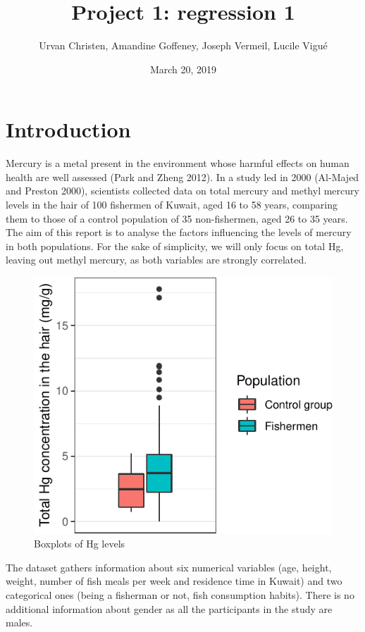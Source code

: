 \documentclass[12pt,]{article}
\title{Project 1: regression 1}
\author{Urvan Christen, Amandine Goffeney, Joseph Vermeil, Lucile Vigué}
\date{March 20, 2019}
\begin{document}
\maketitle

\section{Introduction}\label{introduction}

Mercury is a metal present in the environment whose harmful effects on
human health are well assessed (Park and Zheng 2012). In a study led in
2000 (Al-Majed and Preston 2000), scientists collected data on total
mercury and methyl mercury levels in the hair of 100 fishermen of
Kuwait, aged 16 to 58 years, comparing them to those of a control
population of 35 non-fishermen, aged 26 to 35 years. The aim of this
report is to analyse the factors influencing the levels of mercury in
both populations. For the sake of simplicity, we will only focus on
total Hg, leaving out methyl mercury, as both variables are strongly
correlated.

\begin{figure}

\hfill{}\includegraphics{Report_files/figure-latex/unnamed-chunk-4-1} 

\caption{Boxplots of Hg levels}\label{fig:unnamed-chunk-4}
\end{figure}

The dataset gathers information about six numerical variables (age,
height, weight, number of fish meals per week and residence time in
Kuwait) and two categorical ones (being a fisherman or not, fish
consumption habits). There is no additional information about gender as
all the participants in the study are males.
\end{document}
